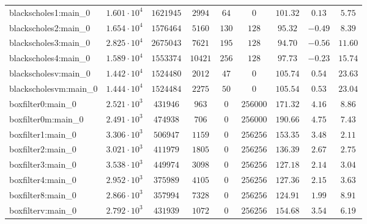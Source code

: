 \begin{tabular}{|l|c|c|c|c|c|c|c|c|}
blackscholes1:main\_0          & $ 1.601 \cdot 10^{4} $ & $ 1621945  $ & $ 2994   $ & $ 64   $ & $ 0        $ & $ 101.32      $ & $ 0.13    $ & $ 5.75    $ \\
blackscholes2:main\_0          & $ 1.654 \cdot 10^{4} $ & $ 1576464  $ & $ 5160   $ & $ 130  $ & $ 128      $ & $ 95.32       $ & $ -0.49   $ & $ 8.39    $ \\
blackscholes3:main\_0          & $ 2.825 \cdot 10^{4} $ & $ 2675043  $ & $ 7621   $ & $ 195  $ & $ 128      $ & $ 94.70       $ & $ -0.56   $ & $ 11.60   $ \\
blackscholes4:main\_0          & $ 1.589 \cdot 10^{4} $ & $ 1553374  $ & $ 10421  $ & $ 256  $ & $ 128      $ & $ 97.73       $ & $ -0.23   $ & $ 15.74   $ \\
blackscholesv:main\_0          & $ 1.442 \cdot 10^{4} $ & $ 1524480  $ & $ 2012   $ & $ 47   $ & $ 0        $ & $ 105.74      $ & $ 0.54    $ & $ 23.63   $ \\
blackscholesvm:main\_0         & $ 1.444 \cdot 10^{4} $ & $ 1524484  $ & $ 2275   $ & $ 50   $ & $ 0        $ & $ 105.54      $ & $ 0.53    $ & $ 23.04   $ \\
boxfilter0:main\_0             & $ 2.521 \cdot 10^{3} $ & $ 431946   $ & $ 963    $ & $ 0    $ & $ 256000   $ & $ 171.32      $ & $ 4.16    $ & $ 8.86    $ \\
boxfilter0m:main\_0            & $ 2.491 \cdot 10^{3} $ & $ 474938   $ & $ 706    $ & $ 0    $ & $ 256000   $ & $ 190.66      $ & $ 4.75    $ & $ 7.43    $ \\
boxfilter1:main\_0             & $ 3.306 \cdot 10^{3} $ & $ 506947   $ & $ 1159   $ & $ 0    $ & $ 256256   $ & $ 153.35      $ & $ 3.48    $ & $ 2.11    $ \\
boxfilter2:main\_0             & $ 3.021 \cdot 10^{3} $ & $ 411979   $ & $ 1805   $ & $ 0    $ & $ 256256   $ & $ 136.39      $ & $ 2.67    $ & $ 2.75    $ \\
boxfilter3:main\_0             & $ 3.538 \cdot 10^{3} $ & $ 449974   $ & $ 3098   $ & $ 0    $ & $ 256256   $ & $ 127.18      $ & $ 2.14    $ & $ 3.04    $ \\
boxfilter4:main\_0             & $ 2.952 \cdot 10^{3} $ & $ 375989   $ & $ 4105   $ & $ 0    $ & $ 256256   $ & $ 127.36      $ & $ 2.15    $ & $ 3.63    $ \\
boxfilter8:main\_0             & $ 2.866 \cdot 10^{3} $ & $ 357994   $ & $ 7328   $ & $ 0    $ & $ 256256   $ & $ 124.91      $ & $ 1.99    $ & $ 8.91    $ \\
boxfilterv:main\_0             & $ 2.792 \cdot 10^{3} $ & $ 431939   $ & $ 1072   $ & $ 0    $ & $ 256256   $ & $ 154.68      $ & $ 3.54    $ & $ 6.19    $ \\

\end{tabular}
